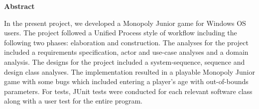 \begin{flushleft} %

\begin{center}
    \vspace{0.9cm}
    \textbf{Abstract}
\end{center}
\doublespacing

In the present project, we developed a Monopoly Junior game for Windows OS users. The project followed a Unified Process style of workflow including the following two phases: elaboration and construction. The analyses for the project included a requirements specification, actor and use-case analyses and a domain analysis. The designs for the project included a system-sequence, sequence and design class analyses. The implementation resulted in a playable Monopoly Junior game with some bugs which included entering a player's age with out-of-bounds parameters. For tests, JUnit tests were conducted for each relevant software class along with a user test for the entire program. 

\end{flushleft}